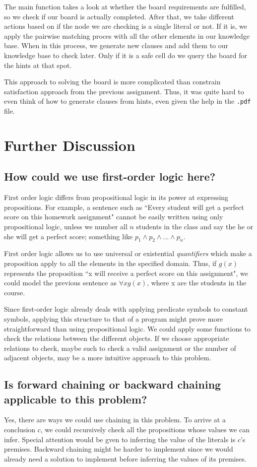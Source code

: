 \documentclass{article}
\begin{document}
The main function takes a look at whether the board requirements are fulfilled, so we 
check if our board is actually completed. After that, we take different actions based 
on if the node we are checking is a single literal or not. If it is, we apply the 
pairwise matching proces with all the other elements in our knowledge base. When in this
process, we generate new clauses and add them to our knowledge base to check later. 
Only if it is a safe cell do we query the board for the hints at that spot.

This approach to solving the board is more complicated than constrain satisfaction 
approach from the previous assignment. Thus, it was quite hard to even think of how 
to generate clauses from hints, even given the help in the \texttt{.pdf} file.
\section{Further Discussion}
	\subsection{How could we use first-order logic here?}
		First order logic differs from propositional logic in its power at expressing propositions. For 
		example, a sentence such as ``Every student will get a perfect score on this homework assignment"
		cannot be easily written using only propositional logic, unless we number all $n$  students  in the
		class and say the he or she will get a perfect score; something like 
		$p_{1}\land p_{2}\land ...\land p_{n}$.
		
		First order logic allows us to use universal or existential \textit{quantifiers} which make a 
		proposition apply to all the elements in the specified domain. Thus, if $g(x)$ represents the 
		proposition ``x will receive a perfect score on this assignment", we could model the previous
		sentence as $\forall x g(x)$, where x are the students in the course.
	
		Since first-order logic already deals with applying predicate symbols to constant symbols,
		applying this structure to that of a program might prove more straightforward than using 
		propositional logic. We could apply some functions to check the relations between the different
		objects. If we choose appropriate relations to check, maybe such to check a valid assignment 
		or the number of adjacent objects, may be a more intuitive approach to this problem.
	\subsection{Is forward chaining or backward chaining applicable to this problem?}
		Yes, there are ways we could use chaining in this problem. To arrive at a conclusion $c$, we could recursively check all the propositions whose values
		we can infer. Special attention would be gven to inferring the value of 
		the literals is $c$'s premises. Backward chaining might be harder to implement
		since we would already need a solution to implement before inferring the 
		values of its premises.
\end{document}
